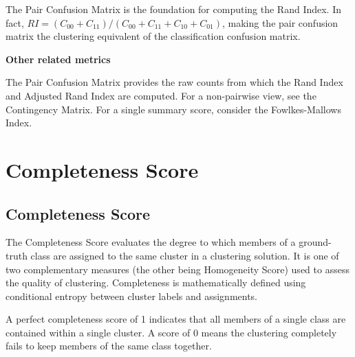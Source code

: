 {The Pair Confusion Matrix is the foundation for computing the Rand Index. In fact, $RI = (C_{00} + C_{11}) / (C_{00} + C_{11} + C_{10} + C_{01})$,
making the pair confusion matrix the clustering equivalent of the classification confusion matrix.}


\textbf{Other related metrics}

The Pair Confusion Matrix provides the raw counts from which the Rand Index and Adjusted Rand Index are computed.
For a non-pairwise view, see the Contingency Matrix. For a single summary score, consider the Fowlkes-Mallows Index.

\clearpage
\thispagestyle{clusteringstyle}
\section{Completeness Score}
\subsection{Completeness Score}

The Completeness Score evaluates the degree to which members of a ground-truth class are assigned to the same cluster in a
clustering solution. It is one of two complementary measures (the other being Homogeneity Score) used to assess the quality of
clustering. Completeness is mathematically defined using conditional entropy between cluster labels and assignments.


\begin{center}
\end{center}

A perfect completeness score of 1 indicates that all members of a single class are contained within a single cluster. 
A score of 0 means the clustering completely fails to keep members of the same class together.

